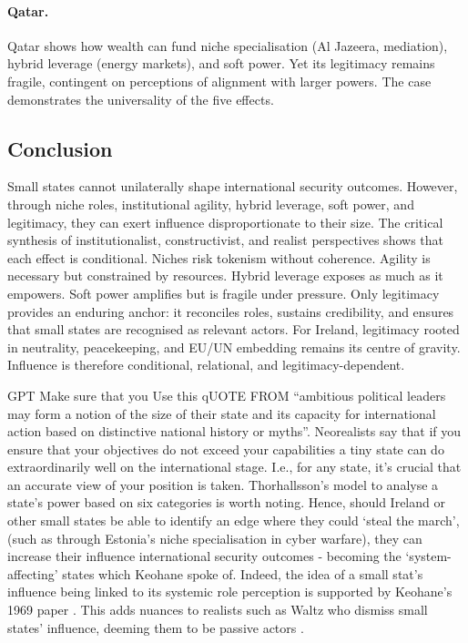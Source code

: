\paragraph{Qatar.}  
Qatar shows how wealth can fund niche specialisation (Al Jazeera, mediation), hybrid leverage (energy markets), and soft power. Yet its legitimacy remains fragile, contingent on perceptions of alignment with larger powers. The case demonstrates the universality of the five effects.

\subsection*{Conclusion}
Small states cannot unilaterally shape international security outcomes. However, through niche roles, institutional agility, hybrid leverage, soft power, and legitimacy, they can exert influence disproportionate to their size. The critical synthesis of institutionalist, constructivist, and realist perspectives shows that each effect is conditional. Niches risk tokenism without coherence. Agility is necessary but constrained by resources. Hybrid leverage exposes as much as it empowers. Soft power amplifies but is fragile under pressure. Only legitimacy provides an enduring anchor: it reconciles roles, sustains credibility, and ensures that small states are recognised as relevant actors. For Ireland, legitimacy rooted in neutrality, peacekeeping, and EU/UN embedding remains its centre of gravity. Influence is therefore conditional, relational, and legitimacy-dependent.

GPT Make sure that you Use this qUOTE FROM \parencite{THORHALLSSON_2006} ``ambitious political leaders may form a notion of the size of their state and its capacity for international action based on distinctive national
history or myths''. Neorealists say that if you ensure that your objectives do not exceed your capabilities a tiny state can do extraordinarily well on the international stage. I.e., for any state, it's crucial that an accurate view of your position is taken. Thorhallsson's model to analyse a state's power based on six categories is worth noting. Hence, should Ireland or other small states be able to identify an edge where they could `steal the march', (such as through Estonia's niche specialisation in cyber warfare), they can increase their influence international security outcomes - becoming the `system-affecting' states which Keohane spoke of. Indeed, the idea of a small stat's influence being linked to its systemic role perception is supported by Keohane's 1969 paper \parencite{KEOHANE_1969}. This adds nuances to realists such as Waltz who dismiss small states' influence, deeming them to be passive actors \parencite{WALTZ_1979}. 

